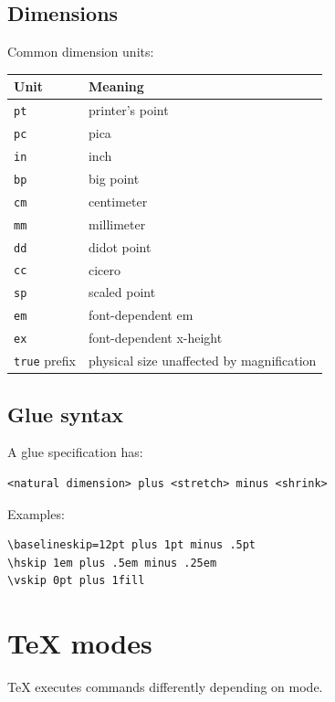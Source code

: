 \documentclass[11pt]{article}
\begin{document}
\subsection{Dimensions}\label{dimensions}

Common dimension units:

\begin{longtable}[]{@{}ll@{}}
\toprule\noalign{}
Unit & Meaning \\
\midrule\noalign{}
\endhead
\bottomrule\noalign{}
\endlastfoot
\texttt{pt} & printer's point \\
\texttt{pc} & pica \\
\texttt{in} & inch \\
\texttt{bp} & big point \\
\texttt{cm} & centimeter \\
\texttt{mm} & millimeter \\
\texttt{dd} & didot point \\
\texttt{cc} & cicero \\
\texttt{sp} & scaled point \\
\texttt{em} & font-dependent em \\
\texttt{ex} & font-dependent x-height \\
\texttt{true} prefix & physical size unaffected by magnification \\
\end{longtable}

\subsection{Glue syntax}\label{glue-syntax}

A glue specification has:

\begin{verbatim}
<natural dimension> plus <stretch> minus <shrink>
\end{verbatim}

Examples:

\begin{verbatim}
\baselineskip=12pt plus 1pt minus .5pt
\hskip 1em plus .5em minus .25em
\vskip 0pt plus 1fill
\end{verbatim}

\section{TeX modes}\label{tex-modes}

TeX executes commands differently depending on mode.
\end{document}
